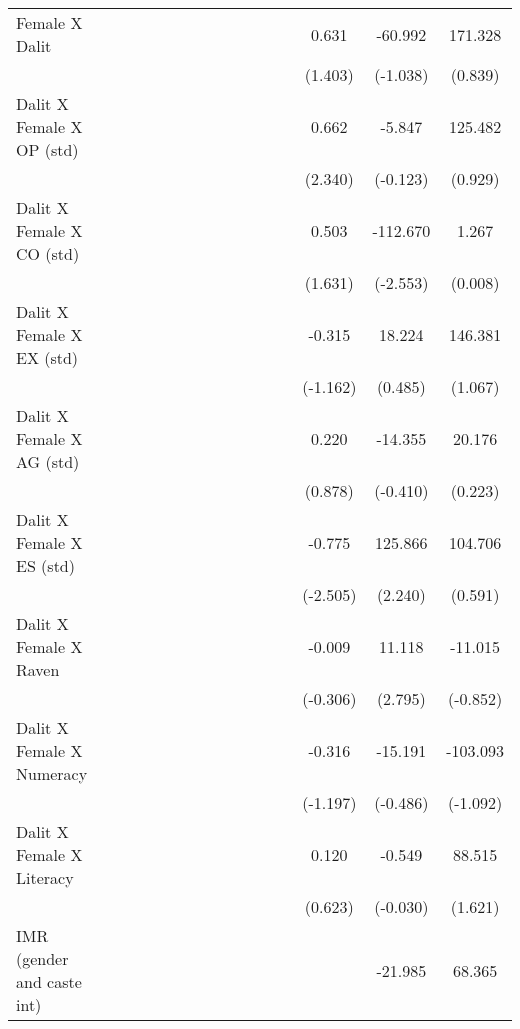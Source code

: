 {\begin{longtable}{@{\extracolsep{\fill}}lccccccccccccccc}
    Female X Dalit &   &   &   &   &   &   &   &   &   &   &   &   & 0.631 & -60.992 & 171.328 \\
      &   &   &   &   &   &   &   &   &   &   &   &   & (1.403) & (-1.038) & (0.839) \\
    Dalit X Female X OP (std) &   &   &   &   &   &   &   &   &   &   &   &   & 0.662 & -5.847 & 125.482 \\
      &   &   &   &   &   &   &   &   &   &   &   &   & (2.340) & (-0.123) & (0.929) \\
    Dalit X Female X CO (std) &   &   &   &   &   &   &   &   &   &   &   &   & 0.503 & -112.670 & 1.267 \\
      &   &   &   &   &   &   &   &   &   &   &   &   & (1.631) & (-2.553) & (0.008) \\
    Dalit X Female X EX (std) &   &   &   &   &   &   &   &   &   &   &   &   & -0.315 & 18.224 & 146.381 \\
      &   &   &   &   &   &   &   &   &   &   &   &   & (-1.162) & (0.485) & (1.067) \\
    Dalit X Female X AG (std) &   &   &   &   &   &   &   &   &   &   &   &   & 0.220 & -14.355 & 20.176 \\
      &   &   &   &   &   &   &   &   &   &   &   &   & (0.878) & (-0.410) & (0.223) \\
    Dalit X Female X ES (std) &   &   &   &   &   &   &   &   &   &   &   &   & -0.775 & 125.866 & 104.706 \\
      &   &   &   &   &   &   &   &   &   &   &   &   & (-2.505) & (2.240) & (0.591) \\
    Dalit X Female X Raven &   &   &   &   &   &   &   &   &   &   &   &   & -0.009 & 11.118 & -11.015 \\
      &   &   &   &   &   &   &   &   &   &   &   &   & (-0.306) & (2.795) & (-0.852) \\
    Dalit X Female X Numeracy &   &   &   &   &   &   &   &   &   &   &   &   & -0.316 & -15.191 & -103.093 \\
      &   &   &   &   &   &   &   &   &   &   &   &   & (-1.197) & (-0.486) & (-1.092) \\
    Dalit X Female X Literacy &   &   &   &   &   &   &   &   &   &   &   &   & 0.120 & -0.549 & 88.515 \\
      &   &   &   &   &   &   &   &   &   &   &   &   & (0.623) & (-0.030) & (1.621) \\
    IMR (gender and caste int) &   &   &   &   &   &   &   &   &   &   &   &   &   & -21.985 & 68.365 \\

\end{longtable}}
